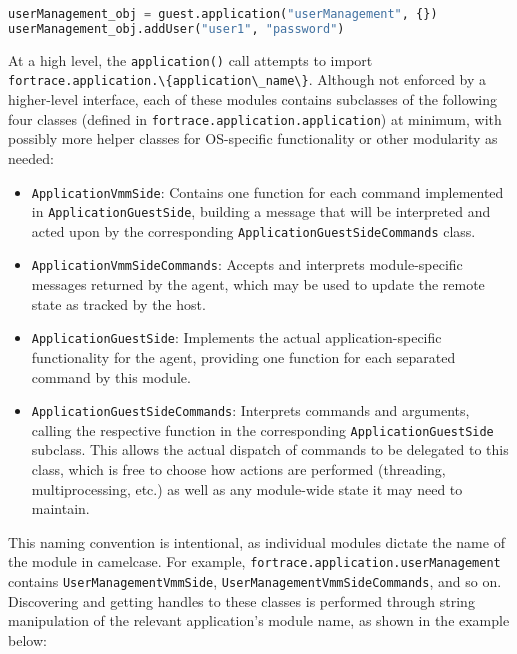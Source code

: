 \documentclass[letterpaper,12pt]{report}
\def\tightlist{}
\newcommand{\passthrough}[1]{#1}
\begin{document}
\begin{lstlisting}[language=Python]
userManagement_obj = guest.application("userManagement", {})
userManagement_obj.addUser("user1", "password")
\end{lstlisting}

At a high level, the \passthrough{\lstinline!application()!} call
attempts to import
\passthrough{\lstinline!fortrace.application.\{application\_name\}!}.
Although not enforced by a higher-level interface, each of these modules
contains subclasses of the following four classes (defined in
\passthrough{\lstinline!fortrace.application.application!}) at minimum,
with possibly more helper classes for OS-specific functionality or other
modularity as needed:

\begin{itemize}
\tightlist
\item
  \passthrough{\lstinline!ApplicationVmmSide!}: Contains one function
  for each command implemented in
  \passthrough{\lstinline!ApplicationGuestSide!}, building a message
  that will be interpreted and acted upon by the corresponding
  \passthrough{\lstinline!ApplicationGuestSideCommands!} class.
\item
  \passthrough{\lstinline!ApplicationVmmSideCommands!}: Accepts and
  interprets module-specific messages returned by the agent, which may
  be used to update the remote state as tracked by the host.
\item
  \passthrough{\lstinline!ApplicationGuestSide!}: Implements the actual
  application-specific functionality for the agent, providing one
  function for each separated command by this module.
\item
  \passthrough{\lstinline!ApplicationGuestSideCommands!}: Interprets
  commands and arguments, calling the respective function in the
  corresponding \passthrough{\lstinline!ApplicationGuestSide!} subclass.
  This allows the actual dispatch of commands to be delegated to this
  class, which is free to choose how actions are performed (threading,
  multiprocessing, etc.) as well as any module-wide state it may need to
  maintain.
\end{itemize}

This naming convention is intentional, as individual modules dictate the
name of the module in camelcase. For example,
\passthrough{\lstinline!fortrace.application.userManagement!} contains
\passthrough{\lstinline!UserManagementVmmSide!},
\passthrough{\lstinline!UserManagementVmmSideCommands!}, and so on.
Discovering and getting handles to these classes is performed through
string manipulation of the relevant application's module name, as shown
in the example below:
\end{document}
